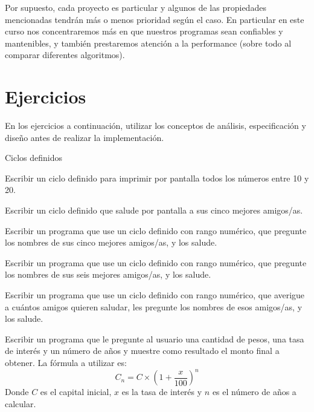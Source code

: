 Por supuesto, cada proyecto es particular y algunos de las propiedades
mencionadas tendrán más o menos prioridad según el caso. En particular en este
curso nos concentraremos más en que nuestros programas sean confiables y
mantenibles, y también prestaremos atención a la performance (sobre todo al
comparar diferentes algoritmos).

\newpage
\section{Ejercicios}

\begin{extract*}
En los ejercicios a continuación, utilizar los conceptos de análisis,
especificación y diseño antes de realizar la implementación.
\end{extract*}

\begin{ejercicio} Ciclos definidos
\begin{partes}
	\item Escribir un ciclo definido para imprimir por pantalla
todos los números entre 10 y 20.
	\item Escribir un ciclo definido que salude por pantalla a
sus cinco mejores amigos/as.
	\item Escribir un programa que use un ciclo definido con
rango numérico, que pregunte los nombres de sus cinco mejores
amigos/as, y los salude.
	\item Escribir un programa que use un ciclo definido con
rango numérico, que pregunte los nombres de sus seis mejores
amigos/as, y los salude.
	\item Escribir un programa que use un ciclo definido con
rango numérico, que averigue a cuántos amigos quieren saludar, les
pregunte los nombres de esos amigos/as, y los salude.
\end{partes}
\end{ejercicio}

\begin{ejercicio}
Escribir un programa que le pregunte al usuario una cantidad de pesos,
una tasa de interés y un número de años y muestre como resultado el monto
final a obtener.  La fórmula a utilizar es:
\begin{displaymath}
C_n = C \times (1+\frac{x}{100})^n
\end{displaymath}
Donde $C$ es el capital inicial, $x$ es la tasa de interés y $n$ es el
número de años a calcular.
\end{ejercicio}

